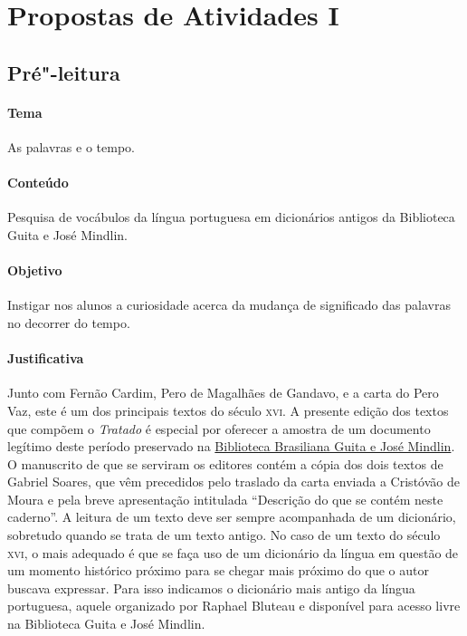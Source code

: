 \documentclass[12pt]{extarticle}
\begin{document}
\tableofcontents


\section{Propostas de Atividades I}

\subsection{Pré"-leitura}

\paragraph{Tema} As palavras e o tempo. 

\paragraph{Conteúdo} Pesquisa de vocábulos da língua portuguesa em 
dicionários antigos da Biblioteca Guita e José Mindlin. 

\paragraph{Objetivo} Instigar nos alunos a curiosidade acerca da mudança
de significado das palavras no decorrer do tempo. 

\paragraph{Justificativa} Junto com Fernão Cardim, Pero de Magalhães de 
Gandavo, e a carta do Pero Vaz, este é um dos principais textos do século 
\textsc{xvi}. A presente edição dos textos que compõem o \emph{Tratado} 
é especial por oferecer a amostra de um documento legítimo deste período
preservado na \href{https://digital.bbm.usp.br/view/?45000009023#page/1/mode/2up}{Biblioteca Brasiliana Guita e José Mindlin}. O manuscrito 
de que se serviram os editores contém a cópia dos dois textos de Gabriel 
Soares, que vêm precedidos pelo traslado da carta enviada a Cristóvão de 
Moura e pela breve apresentação intitulada ``Descrição do que se contém 
neste caderno''. 
A leitura de um texto deve ser sempre acompanhada de um dicionário,
sobretudo quando se trata de um texto antigo. No caso de um texto do 
século \textsc{xvi}, o mais adequado é que se faça uso de um dicionário 
da língua em questão de um momento histórico próximo para se chegar mais 
próximo do que o autor buscava expressar. Para isso indicamos o dicionário 
mais antigo da língua portuguesa, aquele organizado por Raphael Bluteau e 
disponível para acesso livre na Biblioteca Guita e José Mindlin.
\end{document}
